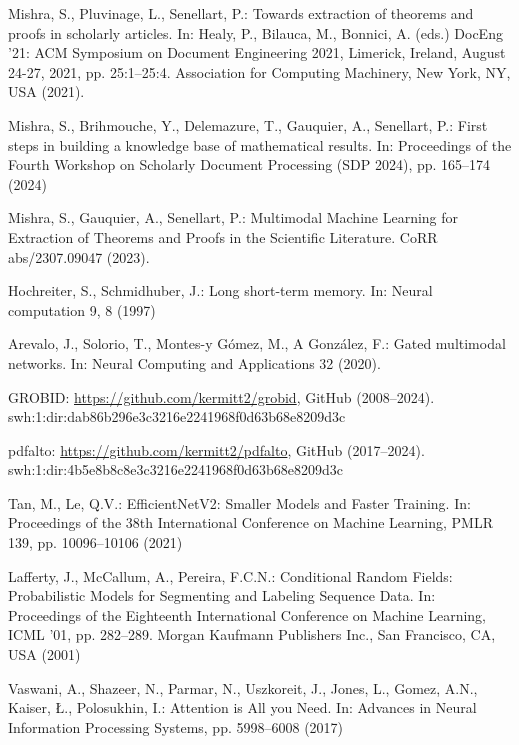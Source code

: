 \documentclass[runningheads]{llncs}
\begin{document}
%
\begin{thebibliography}{10}
Mishra, S., Pluvinage, L., Senellart, P.: Towards extraction of theorems and proofs in scholarly articles. In: Healy, P., Bilauca, M., Bonnici, A. (eds.) DocEng '21: ACM Symposium on Document Engineering 2021, Limerick, Ireland, August 24-27, 2021, pp. 25:1--25:4. Association for Computing Machinery, New York, NY, USA (2021). 

Mishra, S., Brihmouche, Y., Delemazure, T., Gauquier, A., Senellart, P.: First steps in building a knowledge base of mathematical results. In: Proceedings of the Fourth Workshop on Scholarly Document Processing (SDP 2024), pp. 165--174 (2024)

Mishra, S., Gauquier, A., Senellart, P.: Multimodal Machine Learning for Extraction of Theorems and Proofs in the Scientific Literature. CoRR abs/2307.09047 (2023). 

Hochreiter, S., Schmidhuber, J.:  Long short-term memory. In: Neural computation 9, 8 (1997)

Arevalo, J., Solorio, T., Montes-y Gómez, M., A González, F.: Gated multimodal networks. In: Neural Computing and Applications 32 (2020). 

GROBID: \url{https://github.com/kermitt2/grobid}, GitHub (2008--2024). swh:1:dir:dab86b296e3c3216e2241968f0d63b68e8209d3c

pdfalto: \url{https://github.com/kermitt2/pdfalto}, GitHub (2017--2024). swh:1:dir:4b5e8b8c8e3c3216e2241968f0d63b68e8209d3c

Tan, M., Le, Q.V.: EfficientNetV2: Smaller Models and Faster Training. In: Proceedings of the 38th International Conference on Machine Learning, PMLR 139, pp. 10096--10106 (2021)

Lafferty, J., McCallum, A., Pereira, F.C.N.: Conditional Random Fields: Probabilistic Models for Segmenting and Labeling Sequence Data. In: Proceedings of the Eighteenth International Conference on Machine Learning, ICML '01, pp. 282--289. Morgan Kaufmann Publishers Inc., San Francisco, CA, USA (2001)

Vaswani, A., Shazeer, N., Parmar, N., Uszkoreit, J., Jones, L., Gomez, A.N., Kaiser, Ł., Polosukhin, I.: Attention is All you Need. In: Advances in Neural Information Processing Systems, pp. 5998--6008 (2017)
\end{thebibliography}
\end{document}
